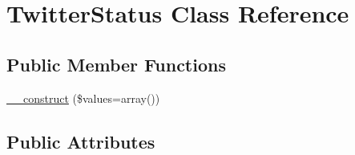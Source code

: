\hypertarget{classTwitterStatus}{
\section{TwitterStatus Class Reference}
\label{classTwitterStatus}
}
\subsection*{Public Member Functions}
\begin{CompactItemize}
\item 
\hyperlink{classTwitterStatus_0a3ca3eab02c0f1444e27d33cdbfd8f5}{\_\-\_\-construct} (\$values=array())
\end{CompactItemize}
\subsection*{Public Attributes}
